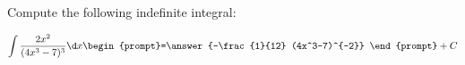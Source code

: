 \documentclass{ximera}
\author{Jim Talamo}
\begin{document}
\begin{exercise}
Compute the following indefinite integral:

\[
\int \frac{2x^2}{(4x^3-7)^3} \d x 
\begin{prompt}=\answer{-\frac{1}{12} (4x^3-7)^{-2}} \end{prompt}+C
\]
\end{exercise}
\end{document}
